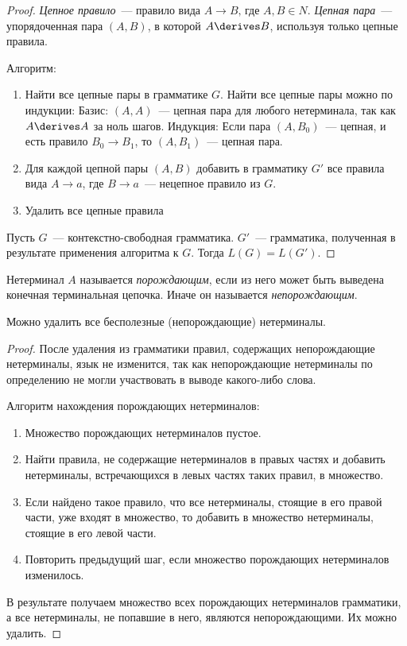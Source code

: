 \begin{proof}
    \emph{Цепное правило}~--- правило вида $A \to B\text{, где } A, B \in N$.
    \emph{Цепная пара}~--- упорядоченная пара $(A,B)$, в которой $A\derives B$, используя только цепные правила.

    Алгоритм:
    \begin{enumerate}
        \item Найти все цепные пары в грамматике $G$.
              Найти все цепные пары можно по индукции:
              Базис: $(A,A)$~--- цепная пара для любого нетерминала, так как $A\derives A$ за ноль шагов.
              Индукция: Если пара $(A,B_0)$~--- цепная, и есть правило $B_0 \to B_1$, то $(A,B_1)$~--- цепная пара.
        \item Для каждой цепной пары $(A,B)$ добавить в грамматику $G'$ все правила вида $A \to a$, где $B \to a$~--- нецепное правило из $G$.
        \item Удалить все цепные правила
    \end{enumerate}
    Пусть $G$~--- контекстно-свободная грамматика. $G'$~--- грамматика, полученная в результате применения алгоритма к $G$. Тогда $L(G)=L(G')$.
\end{proof}

\begin{definition}
    Нетерминал $A$ называется \emph{порождающим}, если из него может быть выведена конечная терминальная цепочка.
    Иначе он называется \emph{непорождающим}.
\end{definition}

\begin{lemma}
    Можно удалить все бесполезные (непорождающие) нетерминалы.
\end{lemma}

\begin{proof}
    После удаления из грамматики правил, содержащих непорождающие нетерминалы, язык не изменится, так как непорождающие нетерминалы по определению не могли участвовать в выводе какого-либо слова.

    Алгоритм нахождения порождающих нетерминалов:
    \begin{enumerate}
        \item Множество порождающих нетерминалов пустое.
        \item Найти правила, не содержащие нетерминалов в правых частях и добавить нетерминалы, встречающихся в левых частях таких правил, в множество.
        \item Если найдено такое правило, что все нетерминалы, стоящие в его правой части, уже входят в множество, то добавить в множество нетерминалы, стоящие в его левой части.
        \item Повторить предыдущий шаг, если множество порождающих нетерминалов изменилось.
    \end{enumerate}
    В результате получаем множество всех порождающих нетерминалов грамматики, а все нетерминалы, не попавшие в него, являются непорождающими.
    Их можно удалить.
\end{proof}

